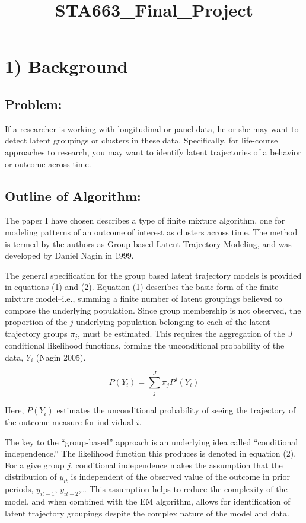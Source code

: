 \documentclass{article}
\title{STA663\_Final\_Project}
\begin{document}
    
    
    \maketitle
    
    

    
    \section{1) Background}\label{background}

    \subsection{Problem:}\label{problem}

If a researcher is working with longitudinal or panel data, he or she
may want to detect latent groupings or clusters in these data.
Specifically, for life-course approaches to research, you may want to
identify latent trajectories of a behavior or outcome across time.

\subsection{Outline of Algorithm:}\label{outline-of-algorithm}

The paper I have chosen describes a type of finite mixture algorithm,
one for modeling patterns of an outcome of interest as clusters across
time. The method is termed by the authors as Group-based Latent
Trajectory Modeling, and was developed by Daniel Nagin in 1999.

The general specification for the group based latent trajectory models
is provided in equations (1) and (2). Equation (1) describes the basic
form of the finite mixture model--i.e., summing a finite number of
latent groupings believed to compose the underlying population. Since
group membership is not observed, the proportion of the \(j\) underlying
population belonging to each of the latent trajectory groups \(\pi_j\),
must be estimated. This requires the aggregation of the \(J\)
conditional likelihood functions, forming the unconditional probability
of the data, \(Y_i\) (Nagin 2005).

\[P(Y_i) = \sum_{j}^J \pi_j P^j (Y_i)\tag{1}\]

Here, \(P(Y_i)\) estimates the unconditional probability of seeing the
trajectory of the outcome measure for individual \(i\).

The key to the ``group-based'' approach is an underlying idea called
``conditional independence.'' The likelihood function this produces is
denoted in equation (2). For a give group \(j\), conditional
independence makes the assumption that the distribution of \(y_{it}\) is
independent of the observed value of the outcome in prior periods,
\(y_{it-1}\), \(y_{it-2}\),\ldots{} This assumption helps to reduce the
complexity of the model, and when combined with the EM algorithm, allows
for identification of latent trajectory groupings despite the complex
nature of the model and data.
\end{document}
